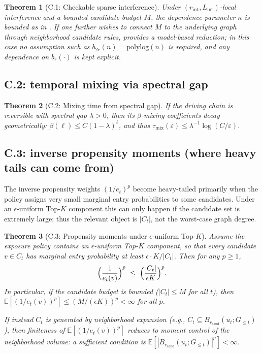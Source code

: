 \documentclass[11pt]{article}
\newcommand{\E}{\mathbb{E}}
\newcommand{\1}{\mathbf{1}}
\newcommand{\polylog}{\mathrm{polylog}}
\theoremstyle{plain}
\newtheorem{theorem}{Theorem}[section]
\theoremstyle{definition}
\theoremstyle{remark}
\begin{document}
\begin{theorem}[C.1: Checkable sparse interference]\label{thm:C1}
Under $(r_{\mathrm{int}},L_{\mathrm{int}})$-local interference and a bounded candidate budget $M$,
the dependence parameter $\kappa$ is bounded as in .
If one further wishes to connect $M$ to the underlying graph through neighborhood candidate rules,
 provides a model-based reduction; in this case no assumption such as
$b_{2r}(n)=\polylog(n)$ is required, and any dependence on $b_r(\cdot)$ is kept explicit.
\end{theorem}


\subsection{C.2: temporal mixing via spectral gap}
\begin{theorem}[C.2: Mixing time from spectral gap]\label{thm:C2}
If the driving chain is reversible with spectral gap $\lambda>0$, then its $\beta$-mixing coefficients decay geometrically:
$\beta(\ell)\le C(1-\lambda)^\ell$, and thus $\tau_{\mathrm{mix}}(\varepsilon)\le \lambda^{-1}\log(C/\varepsilon)$.
\end{theorem}


\subsection{C.3: inverse propensity moments (where heavy tails can come from)}\label{subsec:C3}
The inverse propensity weights $(1/e_t)^p$ become heavy-tailed primarily when the policy assigns
very small marginal entry probabilities to some candidates.  Under an $\epsilon$-uniform Top-$K$
component this can only happen if the candidate set is extremely large; thus the relevant object is
$|C_t|$, not the worst-case graph degree.

\begin{theorem}[C.3: Propensity moments under $\epsilon$-uniform Top-$K$]\label{thm:C3}
Assume the exposure policy contains an $\epsilon$-uniform Top-$K$ component, so that every candidate
$v\in C_t$ has marginal entry probability at least $\epsilon\cdot K/|C_t|$.
Then for any $p\ge 1$,
\[
\Bigl(\frac{1}{e_t(v)}\Bigr)^p \ \le\ \Bigl(\frac{|C_t|}{\epsilon K}\Bigr)^p.
\]
In particular, if the candidate budget is bounded ($|C_t|\le M$ for all $t$), then
$\E[(1/e_t(v))^p]\le (M/(\epsilon K))^p<\infty$ for all $p$.

If instead $C_t$ is generated by neighborhood expansion (e.g., $C_t\subseteq B_{r_{\mathrm{cand}}}(u_t;G_{\le t})$),
then finiteness of $\E[(1/e_t(v))^p]$ reduces to moment control of the neighborhood volume:
a sufficient condition is $\E[|B_{r_{\mathrm{cand}}}(u_t;G_{\le t})|^p]<\infty$.
\end{theorem}
\end{document}
